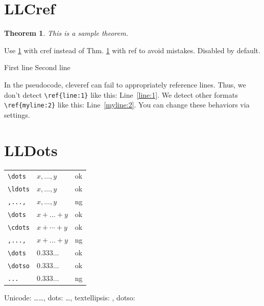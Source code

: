 \documentclass[a4paper]{article}
\newcommand{\tA}[1]{\textcolor{cA}{#1}}
\newcommand{\tD}[1]{\textcolor{cD}{#1}}
\newtheorem{theorem}{Theorem}
\begin{document}
\section{LLCref}

\begin{theorem}\label{thm:sample}
	This is a sample theorem.
\end{theorem}

Use \cref{thm:sample} with cref instead of Thm. \ref{thm:sample} with ref to avoid mistakes.
Disabled by default.

\begin{algorithm}
	\caption{Sample Algorithm}
	\begin{algorithmic}[1]
		\State First line \label{line:1}
		\State Second line \label{myline:2}
	\end{algorithmic}
\end{algorithm}

In the pseudocode, cleveref can fail to appropriately reference lines.
Thus, we don't detect \verb|\ref{line:1}| like this: Line~\ref{line:1}.
We detect other formats \verb|\ref{myline:2}| like this: Line~\ref{myline:2}.
You can change these behaviors via settings.

\section{LLDots}

\begin{table}[H]
	\centering
	\begin{tabular}{lll}
		\verb|\dots|  & $x,\dots,y$   & \tA{ok} \\
		\verb|\ldots| & $x,\ldots,y$  & \tA{ok} \\
		\verb|,...,|  & $x,...,y$     & \tD{ng} \\[0.5em]
		\verb|\dots|  & $x+\dots+y$   & \tA{ok} \\
		\verb|\cdots| & $x+\cdots+y$  & \tA{ok} \\
		\verb|,...,|  & $x+...+y$     & \tD{ng} \\[0.5em]
		\verb|\dots|  & $0.333\dots$  & \tA{ok} \\
		\verb|\dotso| & $0.333\dotso$ & \tA{ok} \\
		\verb|...|    & $0.333...$    & \tD{ng} \\
	\end{tabular}
\end{table}

Unicode: ……, dots: \dots, textellipsis: \textellipsis, dotso: \dotso
\end{document}
